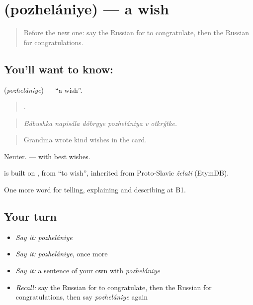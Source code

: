 \section[\texorpdfstring{\ru{пожелание} (pozhelániye)}{пожелание (pozhelániye)}]{ (pozhelániye) — a wish}

\label{lesson:RU-C312-pozhelaniye}



\begin{quote}
Before the new one: say the Russian for to congratulate, then the Russian for congratulations.
\end{quote}

\subsection*{You'll want to know: }
\textbf{} (\emph{pozhelániye}) — \textquotedblleft{}a wish\textquotedblright{}.

\begin{quote}
     .
\end{quote}

\begin{quote}
\emph{Bábushka napisála dóbryye pozhelániya v otkrýtke.}
\end{quote}

\begin{quote}
Grandma wrote kind wishes in the card.
\end{quote}

Neuter. \emph{  } — with best wishes.

\begin{cousinweb}
\emph{} is built on \emph{}, from \emph{} \textquotedblleft{}to wish\textquotedblright{}, inherited from Proto-Slavic \emph{želati} (EtymDB).
\end{cousinweb}

\begin{grammarlens}[title={What you've built}]
One more word for telling, explaining and describing at B1.
\end{grammarlens}

\subsection*{Your turn}
\begin{itemize}
\raggedright
  \item \emph{Say it:} \emph{pozhelániye}
  \item \emph{Say it:} \emph{pozhelániye}, once more
  \item \emph{Say it:} a sentence of your own with \emph{pozhelániye}
  \item \emph{Recall:} say the Russian for to congratulate, then the Russian for congratulations, then say \emph{pozhelániye} again
\end{itemize}

